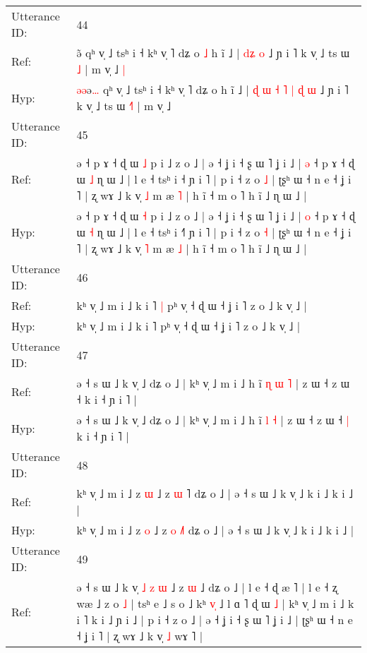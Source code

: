 \documentclass[10pt]{article}
\DeclareRobustCommand{\hl}[1]{{\textcolor{red}{#1}}}
\begin{document}
\begin{longtable}{ll}
 \\
\midrule
Utterance ID: & 44 \\
Ref: & \hl{}\hl{}ə\hl{̃} qʰ v̩ ˩ tsʰ i ˧ kʰ v̩ ˥ dʑ o\hl{ }\hl{˩} h ĩ ˩ |\hl{}\hl{}\hl{}\hl{}\hl{}\hl{}\hl{}\hl{} \hl{}\hl{d}\hl{ʑ} \hl{o} ˩ ɲ i ˥ k v̩ ˩ ts ɯ \hl{}\hl{˩} | m v̩ ˩\hl{ }\hl{|}
 \\
Hyp: & \hl{ə}\hl{ə}ə\hl{…} qʰ v̩ ˩ tsʰ i ˧ kʰ v̩ ˥ dʑ o\hl{}\hl{} h ĩ ˩ |\hl{ }\hl{ɖ}\hl{ }\hl{ɯ}\hl{ }\hl{˧}\hl{ }\hl{˥} \hl{|}\hl{ }\hl{ɖ} \hl{ɯ} ˩ ɲ i ˥ k v̩ ˩ ts ɯ \hl{˧}\hl{˥} | m v̩ ˩\hl{}\hl{}
 \\
\midrule
Utterance ID: & 45 \\
Ref: & ə ˧ p ɤ ˧ ɖ ɯ \hl{˩} p i ˩ z o ˩ | ə ˧ ʝ i ˧ ʂ ɯ ˥ ʝ i ˩ | \hl{ə} ˧ p ɤ ˧ ɖ ɯ \hl{˩} ɳ ɯ ˩ | l e ˧ tsʰ i ˧\hl{} ɲ i ˥ | p i ˧ z o \hl{˩} | ʈʂʰ ɯ ˧ n e ˧ ʝ i ˥ | ʐ wɤ ˩ k v̩ \hl{˩} m æ \hl{˥} | h ĩ ˧ m o ˥ h ĩ ˩ ɳ ɯ ˩ |
 \\
Hyp: & ə ˧ p ɤ ˧ ɖ ɯ \hl{˧} p i ˩ z o ˩ | ə ˧ ʝ i ˧ ʂ ɯ ˥ ʝ i ˩ | \hl{o} ˧ p ɤ ˧ ɖ ɯ \hl{˧} ɳ ɯ ˩ | l e ˧ tsʰ i ˧\hl{˥} ɲ i ˥ | p i ˧ z o \hl{˧} | ʈʂʰ ɯ ˧ n e ˧ ʝ i ˥ | ʐ wɤ ˩ k v̩ \hl{˥} m æ \hl{˩} | h ĩ ˧ m o ˥ h ĩ ˩ ɳ ɯ ˩ |
 \\
\midrule
Utterance ID: & 46 \\
Ref: & kʰ v̩ ˩ m i ˩ k i ˥\hl{ }\hl{|} pʰ v̩ ˧ ɖ ɯ ˧ ʝ i ˥ z o ˩ k v̩ ˩ |
 \\
Hyp: & kʰ v̩ ˩ m i ˩ k i ˥\hl{}\hl{} pʰ v̩ ˧ ɖ ɯ ˧ ʝ i ˥ z o ˩ k v̩ ˩ |
 \\
\midrule
Utterance ID: & 47 \\
Ref: & ə ˧ s ɯ ˩ k v̩ ˩ dʑ o ˩ | kʰ v̩ ˩ m i ˩ h ĩ\hl{ }\hl{ɳ} \hl{ɯ} \hl{˥} | z ɯ ˧ z ɯ ˧\hl{}\hl{} k i ˧ ɲ i ˥ |
 \\
Hyp: & ə ˧ s ɯ ˩ k v̩ ˩ dʑ o ˩ | kʰ v̩ ˩ m i ˩ h ĩ\hl{}\hl{} \hl{l} \hl{˧} | z ɯ ˧ z ɯ ˧\hl{ }\hl{|} k i ˧ ɲ i ˥ |
 \\
\midrule
Utterance ID: & 48 \\
Ref: & kʰ v̩ ˩ m i ˩ z \hl{ɯ} ˩ z \hl{ɯ} \hl{}˥ dʑ o ˩ | ə ˧ s ɯ ˩ k v̩ ˩ k i ˩ k i ˩ |
 \\
Hyp: & kʰ v̩ ˩ m i ˩ z \hl{o} ˩ z \hl{o} \hl{˩}˥ dʑ o ˩ | ə ˧ s ɯ ˩ k v̩ ˩ k i ˩ k i ˩ |
 \\
\midrule
Utterance ID: & 49 \\
Ref: & ə ˧ s ɯ ˩ k v̩\hl{ }\hl{˩}\hl{ }\hl{z}\hl{ }\hl{ɯ} ˩ z \hl{ɯ} ˩ dʑ o ˩ |\hl{}\hl{} l e ˧ ɖ æ \hl{}˥ | l e ˧ ʐ wæ ˩\hl{}\hl{} z o \hl{˩} | tsʰ e ˩ s o ˩\hl{}\hl{} kʰ \hl{v}\hl{̩} ˩ l ɑ ˥\hl{}\hl{} ɖ\hl{}\hl{}\hl{}\hl{}\hl{}\hl{} ɯ \hl{˩} | kʰ v̩ ˩ m i ˩ k i ˥ k i ˩ ɲ i ˩ | p i ˧ z o ˩ | ə ˧ ʝ i ˧ ʂ ɯ ˥ ʝ i ˩ | ʈʂʰ ɯ ˧ n e ˧ ʝ i ˥ | ʐ wɤ ˩ k v̩\hl{ }\hl{˩} wɤ ˥ |

\end{longtable}
\end{document}
